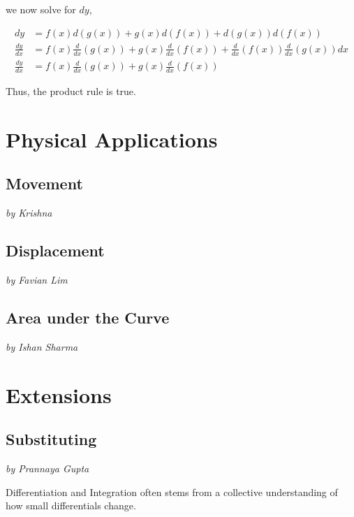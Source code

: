 \documentclass[a4paper,12pt,oneside]{book}
\begin{document}
\noindent we now solve for $dy$,

$$\begin{aligned}
dy&=f(x)d(g(x))+g(x)d(f(x))+d(g(x))d(f(x))\\
\frac{dy}{dx}&=f(x)\frac{d}{dx}(g(x))+g(x)\frac{d}{dx}(f(x))+\frac{d}{dx}(f(x))\frac{d}{dx}(g(x))dx\\
\frac{dy}{dx}&=f(x)\frac{d}{dx}(g(x))+g(x)\frac{d}{dx}(f(x))
\end{aligned}$$

\noindent Thus, the product rule is true.

\part{Physical Applications}

\newpage
\chapter{Movement}
\vspace{-30pt}
\large \textit{by Krishna}


\newpage
\chapter{Displacement}
\vspace{-30pt}
\large \textit{by Favian Lim}


\newpage
\chapter{Area under the Curve}
\vspace{-30pt}
\large \textit{by Ishan Sharma}


\part{Extensions}

\newpage
\chapter{Substituting}
\vspace{-30pt}
\large \textit{by Prannaya Gupta}

Differentiation and Integration often stems from a collective understanding of how small differentials change.
\end{document}
